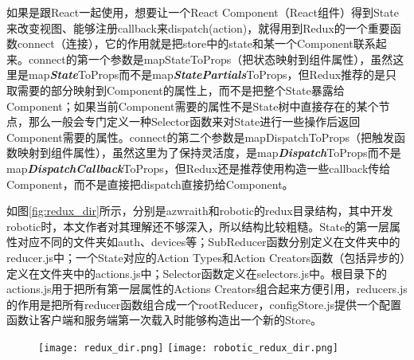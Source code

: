 如果是跟React一起使用，想要让一个React Component（React组件）得到State来改变视图、能够注册callback来dispatch(action)，就得用到Redux的一个重要函数connect（连接），它的作用就是把store中的state和某一个Component联系起来。connect的第一个参数是mapStateToProps（把状态映射到组件属性），虽然这里是map\emph{\textbf{State}}ToProps而不是map\emph{\textbf{StatePartials}}ToProps，但Redux推荐的是只取需要的部分映射到Component的属性上，而不是把整个State暴露给Component；如果当前Component需要的属性不是State树中直接存在的某个节点，那么一般会专门定义一种Selector函数来对State进行一些操作后返回Component需要的属性。connect的第二个参数是mapDispatchToProps（把触发函数映射到组件属性），虽然这里为了保持灵活度，是map\emph{\textbf{Dispatch}}ToProps而不是map\emph{\textbf{DispatchCallback}}ToProps，但Redux还是推荐使用构造一些callback传给Component，而不是直接把dispatch直接扔给Component。

如图\ref{fig:redux_dir}所示，分别是azwraith和robotic的redux目录结构，其中开发robotic时，本文作者对其理解还不够深入，所以结构比较粗糙。State的第一层属性对应不同的文件夹如auth、devices等；SubReducer函数分别定义在文件夹中的reducer.js中；一个State对应的Action Types和Action Creators函数（包括异步的）定义在文件夹中的actions.js中；Selector函数定义在selectors.js中。根目录下的actions.js用于把所有第一层属性的Actions Creators组合起来方便引用，reducers.js的作用是把所有reducer函数组合成一个rootReducer，configStore.js提供一个配置函数让客户端和服务端第一次载入时能够构造出一个新的Store。
\begin{figure}[!htp]
 \centering
 \texttt{[image: redux\_dir.png]}
  \hspace{1cm}
 \texttt{[image: robotic\_redux\_dir.png]}
\end{figure}

